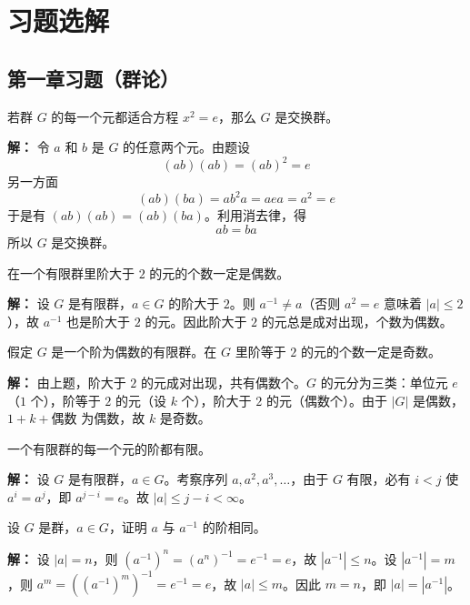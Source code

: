 \chapter{习题选解}

\section{第一章习题（群论）}

\begin{example}[若群 $G$ 的每个元都适合 $x^2=e$，则 $G$ 是交换群]
若群 $G$ 的每一个元都适合方程 $x^2=e$，那么 $G$ 是交换群。

\textbf{解：} 令 $a$ 和 $b$ 是 $G$ 的任意两个元。由题设
\[
(ab)(ab)=(ab)^2=e
\]
另一方面
\[
(ab)(ba)=ab^2a=aea=a^2=e
\]
于是有 $(ab)(ab)=(ab)(ba)$。利用消去律，得
\[
ab=ba
\]
所以 $G$ 是交换群。
\end{example}

\begin{example}
在一个有限群里阶大于 $2$ 的元的个数一定是偶数。

\textbf{解：} 设 $G$ 是有限群，$a\in G$ 的阶大于 $2$。则 $a^{-1}\ne a$（否则 $a^2=e$ 意味着 $|a|\le2$），故 $a^{-1}$ 也是阶大于 $2$ 的元。因此阶大于 $2$ 的元总是成对出现，个数为偶数。
\end{example}

\begin{example}
假定 $G$ 是一个阶为偶数的有限群。在 $G$ 里阶等于 $2$ 的元的个数一定是奇数。

\textbf{解：} 由上题，阶大于 $2$ 的元成对出现，共有偶数个。$G$ 的元分为三类：单位元 $e$（$1$ 个），阶等于 $2$ 的元（设 $k$ 个），阶大于 $2$ 的元（偶数个）。由于 $|G|$ 是偶数，$1+k+\text{偶数}$ 为偶数，故 $k$ 是奇数。
\end{example}

\begin{example}[有限群的元的阶有限]
一个有限群的每一个元的阶都有限。

\textbf{解：} 设 $G$ 是有限群，$a\in G$。考察序列 $a,a^2,a^3,\ldots$，由于 $G$ 有限，必有 $i<j$ 使 $a^i=a^j$，即 $a^{j-i}=e$。故 $|a|\le j-i<\infty$。
\end{example}

\begin{example}[$|a|=|a^{-1}|$]
设 $G$ 是群，$a\in G$，证明 $a$ 与 $a^{-1}$ 的阶相同。

\textbf{解：} 设 $|a|=n$，则 $(a^{-1})^n=(a^n)^{-1}=e^{-1}=e$，故 $|a^{-1}|\le n$。设 $|a^{-1}|=m$，则 $a^m=((a^{-1})^m)^{-1}=e^{-1}=e$，故 $|a|\le m$。因此 $m=n$，即 $|a|=|a^{-1}|$。
\end{example}

